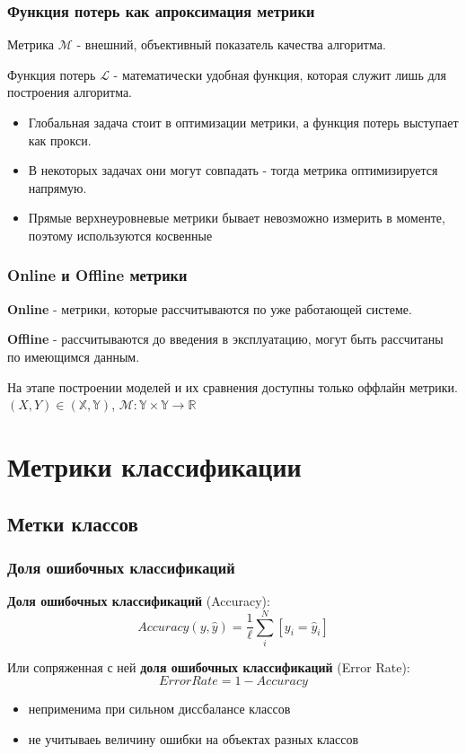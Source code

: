 \documentclass{beamer}
\begin{document}
	\begin{frame}
		\frametitle{Функция потерь как апроксимация метрики}
		Метрика $\mathcal{M}$ - внешний, объективный показатель качества алгоритма. 
		
		Функция потерь $\mathcal{L}$ - математически удобная функция, которая служит лишь для построения алгоритма.
		
		\vspace{15pt}
		\begin{itemize}
			\item Глобальная задача стоит в оптимизации метрики, а функция потерь выступает как прокси.
			\item В некоторых задачах они могут совпадать - тогда метрика оптимизируется напрямую.
			\item Прямые верхнеуровневые метрики бывает невозможно измерить в моменте, поэтому используются косвенные
		\end{itemize}
	\end{frame}
	
	\begin{frame}
		\frametitle{Online и Offline метрики}
		\textbf{Online} - метрики, которые рассчитываются по уже работающей системе.
		
		\textbf{Offline} - рассчитываются до введения в эксплуатацию, могут быть рассчитаны по имеющимся данным.
 		
 		\vspace{15pt}
 		
 		На этапе построении моделей и их сравнения доступны только оффлайн метрики. $(X, Y) \in (\mathbb{X}, \mathbb{Y})$, $\mathcal{M}: \mathbb{Y} \times \mathbb{Y} \rightarrow \mathbb{R}$
	\end{frame}
	
	\section{Метрики классификации}
		
	\subsection{Метки классов}
	
	\begin{frame}
		\frametitle{Доля ошибочных классификаций}
		
		\textbf{Доля ошибочных классификаций} (Accuracy):
		\[
		Accuracy(y, \hat{y}) = \frac{1}{\ell} \sum_{i}^{N} [y_i = \hat{y}_i]
		\]
		
		Или сопряженная с ней \textbf{доля ошибочных классификаций} (Error Rate):
		\[
		ErrorRate = 1 - Accuracy
		\]
		
		\begin{itemize}
			\item неприменима при сильном диссбалансе классов
			\item не учитываеь величину ошибки на объектах разных классов
		\end{itemize}
	\end{frame}
	
\end{document}
